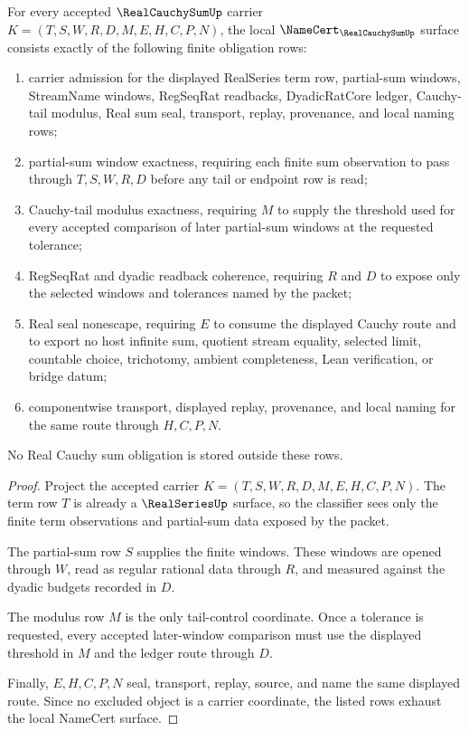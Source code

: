 \begin{theorem}\label{thm:real-cauchy-sum-namecert-obligations}
For every accepted $\RealCauchySumUp$ carrier $K=(T,S,W,R,D,M,E,H,C,P,N)$, the local $\NameCert_{\RealCauchySumUp}$ surface consists exactly of the following finite obligation rows:
\begin{enumerate}
\item carrier admission for the displayed RealSeries term row, partial-sum windows, StreamName windows, RegSeqRat readbacks, DyadicRatCore ledger, Cauchy-tail modulus, Real sum seal, transport, replay, provenance, and local naming rows;
\item partial-sum window exactness, requiring each finite sum observation to pass through $T,S,W,R,D$ before any tail or endpoint row is read;
\item Cauchy-tail modulus exactness, requiring $M$ to supply the threshold used for every accepted comparison of later partial-sum windows at the requested tolerance;
\item RegSeqRat and dyadic readback coherence, requiring $R$ and $D$ to expose only the selected windows and tolerances named by the packet;
\item Real seal nonescape, requiring $E$ to consume the displayed Cauchy route and to export no host infinite sum, quotient stream equality, selected limit, countable choice, trichotomy, ambient completeness, Lean verification, or bridge datum;
\item componentwise transport, displayed replay, provenance, and local naming for the same route through $H,C,P,N$.
\end{enumerate}
No Real Cauchy sum obligation is stored outside these rows.
\end{theorem}
\begin{proof}
Project the accepted carrier $K=(T,S,W,R,D,M,E,H,C,P,N)$. The term row $T$ is already a $\RealSeriesUp$ surface, so the classifier sees only the finite term observations and partial-sum data exposed by the packet.

The partial-sum row $S$ supplies the finite windows. These windows are opened through $W$, read as regular rational data through $R$, and measured against the dyadic budgets recorded in $D$.

The modulus row $M$ is the only tail-control coordinate. Once a tolerance is requested, every accepted later-window comparison must use the displayed threshold in $M$ and the ledger route through $D$.

Finally, $E,H,C,P,N$ seal, transport, replay, source, and name the same displayed route. Since no excluded object is a carrier coordinate, the listed rows exhaust the local NameCert surface.
\end{proof}

